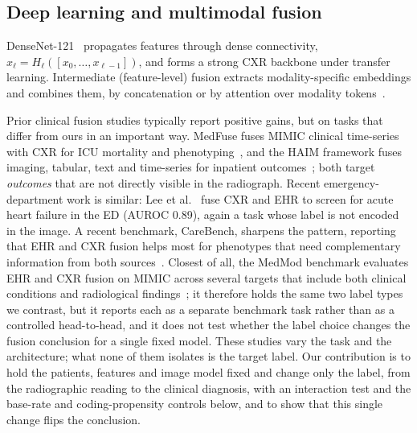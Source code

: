 \documentclass[twocolumn, final]{svjour3}
\begin{document}
\subsection{Deep learning and multimodal fusion}
DenseNet-121~\citep{huang2017densenet} propagates features through dense
connectivity, $x_\ell = H_\ell([x_0,\dots,x_{\ell-1}])$, and forms a strong CXR
backbone under transfer learning. Intermediate (feature-level) fusion extracts
modality-specific embeddings and combines them, by concatenation or by attention
over modality tokens~\citep{acosta2022multimodal}.

Prior clinical fusion studies typically report positive gains, but on tasks that
differ from ours in an important way. MedFuse fuses MIMIC clinical time-series with
CXR for ICU mortality and phenotyping~\citep{hayat2022medfuse}, and the HAIM
framework fuses imaging, tabular, text and time-series for inpatient
outcomes~\citep{soenksen2022multimodal}; both target \emph{outcomes} that are not
directly visible in the radiograph. Recent emergency-department work is similar: Lee
et al.~\citep{lee2024multimodal} fuse CXR and EHR to screen for acute heart failure
in the ED (AUROC 0.89), again a task whose label is not encoded in the image. A recent
benchmark, CareBench, sharpens the pattern, reporting that EHR and CXR fusion helps most
for phenotypes that need complementary information from both sources~\citep{yin2026multimodal}.
Closest of all, the MedMod benchmark evaluates EHR and CXR fusion on MIMIC across several
targets that include both clinical conditions and radiological findings~\citep{elsharief2025medmod};
it therefore holds the same two label types we contrast, but it reports each as a separate
benchmark task rather than as a controlled head-to-head, and it does not test whether the label
choice changes the fusion conclusion for a single fixed model. These studies vary the task and
the architecture; what none of them isolates is the target label. Our contribution is to hold
the patients, features and image model fixed and change only the label, from the radiographic
reading to the clinical diagnosis, with an interaction test and the base-rate and
coding-propensity controls below, and to show that this single change flips the conclusion.
\end{document}
